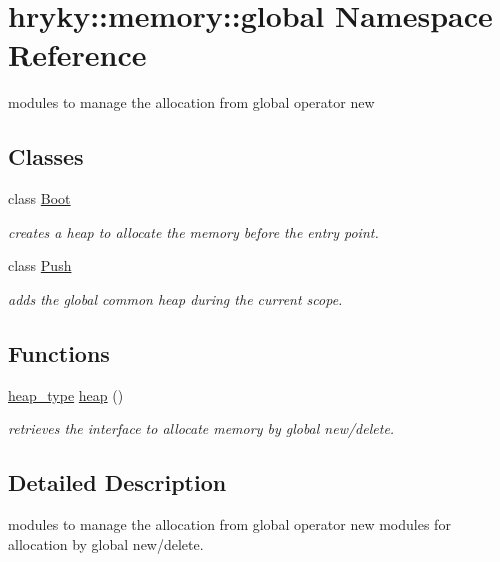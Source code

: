 \hypertarget{namespacehryky_1_1memory_1_1global}{\section{hryky\-:\-:memory\-:\-:global Namespace Reference}
\label{namespacehryky_1_1memory_1_1global}
}


modules to manage the allocation from global operator new  


\subsection*{Classes}
\begin{DoxyCompactItemize}
\item 
class \hyperlink{classhryky_1_1memory_1_1global_1_1_boot}{Boot}
\begin{DoxyCompactList}\small\item\em creates a heap to allocate the memory before the entry point. \end{DoxyCompactList}\item 
class \hyperlink{classhryky_1_1memory_1_1global_1_1_push}{Push}
\begin{DoxyCompactList}\small\item\em adds the global common heap during the current scope. \end{DoxyCompactList}\end{DoxyCompactItemize}
\subsection*{Functions}
\begin{DoxyCompactItemize}
\item 
\hypertarget{namespacehryky_1_1memory_1_1global_a6fc6103f67c837aa0f39b359588409cd}{\hyperlink{classhryky_1_1memory_1_1heap_1_1_base}{heap\-\_\-type} \hyperlink{namespacehryky_1_1memory_1_1global_a6fc6103f67c837aa0f39b359588409cd}{heap} ()}\label{namespacehryky_1_1memory_1_1global_a6fc6103f67c837aa0f39b359588409cd}

\begin{DoxyCompactList}\small\item\em retrieves the interface to allocate memory by global new/delete. \end{DoxyCompactList}\end{DoxyCompactItemize}


\subsection{Detailed Description}
modules to manage the allocation from global operator new modules for allocation by global new/delete. 